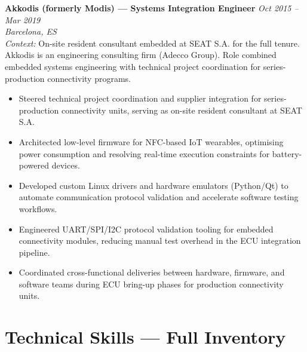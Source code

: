 \documentclass[10pt,a4paper]{article}
\newcommand{\roleentry}[3]{%
  \vspace{4pt}%
  \textbf{#1} \hfill \textit{#2}\\%
  \textit{\small #3}\\[-2pt]%
}
\begin{document}
\vspace{8pt}

\roleentry{Akkodis (formerly Modis) — Systems Integration Engineer}
  {Oct 2015 – Mar 2019}
  {Barcelona, ES}

\textit{Context:} On-site resident consultant embedded at SEAT S.A. for the full tenure.
Akkodis is an engineering consulting firm (Adecco Group). Role combined embedded systems
engineering with technical project coordination for series-production connectivity programs.

\begin{itemize}
  \item Steered technical project coordination and supplier integration for series-production
        connectivity units, serving as on-site resident consultant at SEAT S.A.
  \item Architected low-level firmware for NFC-based IoT wearables, optimising power consumption
        and resolving real-time execution constraints for battery-powered devices.
  \item Developed custom Linux drivers and hardware emulators (Python/Qt) to automate
        communication protocol validation and accelerate software testing workflows.
  \item Engineered UART/SPI/I2C protocol validation tooling for embedded connectivity modules,
        reducing manual test overhead in the ECU integration pipeline.
  \item Coordinated cross-functional deliveries between hardware, firmware, and software teams
        during ECU bring-up phases for production connectivity units.
\end{itemize}

\section{Technical Skills — Full Inventory}
\end{document}
